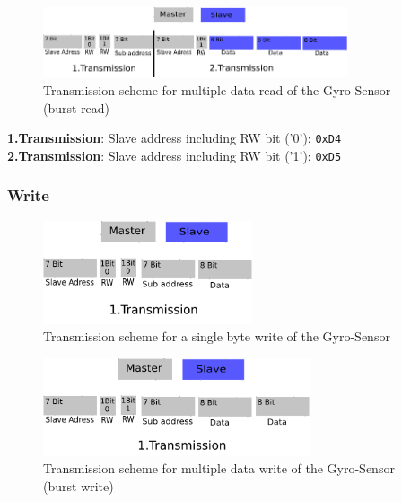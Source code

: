 \begin{itemize}
\begin{itemize}
\begin{figure}[H]
	\centering\includegraphics[width=0.8\textwidth]{fig/I2C_Adressing/ACC_read_multiple}
	\caption[Scheme for multiple data read of the Gyro-Sensor]{Transmission scheme for multiple data read of the Gyro-Sensor (burst read)}
	\label{fig:Gyro2}
\end{figure}

\textbf{1.Transmission}: Slave address including RW bit ('0'): \texttt{0xD4}\\
\textbf{2.Transmission}: Slave address including RW bit ('1'): \texttt{0xD5}

\subsubsection{Write}
\label{subsubsec:Gyrowrite}

\begin{figure}[H]
	\centering\includegraphics[width=0.55\textwidth]{fig/I2C_Adressing/ACC_write_single}
	\caption[Scheme for a single byte write of the Gyro-Sensor]{Transmission scheme for a single byte write of the Gyro-Sensor}
	\label{fig:Gyro3}
\end{figure}

\begin{figure}[H]
	\centering\includegraphics[width=0.7\textwidth]{fig/I2C_Adressing/ACC_write_multiple}
	\caption[Scheme for multiple data write of the Gyro-Sensor]{Transmission scheme for multiple data write of the Gyro-Sensor (burst write)}
	\label{fig:Gyro4}
\end{figure}


\end{itemize}
\end{itemize}
